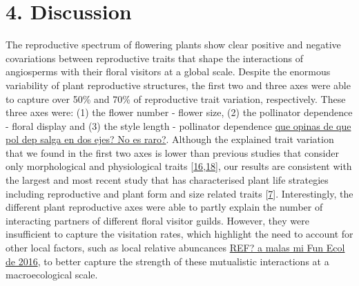 \documentclass[
  12pt,
  a4paper,
]{article}
\begin{document}
\hypertarget{discussion}{%
\section{4. Discussion}\label{discussion}}

The reproductive spectrum of flowering plants show clear positive and negative covariations between reproductive traits that shape the interactions of angiosperms with their floral visitors at a global scale. Despite the enormous variability of plant reproductive structures, the first two and three axes were able to capture over 50\% and 70\% of reproductive trait variation, respectively. These three axes were: (1) the flower number - flower size, (2) the pollinator dependence - floral display and (3) the style length - pollinator dependence \href{}{que opinas de que pol dep salga en dos ejes? No es raro?}. Although the explained trait variation that we found in the first two axes is lower than previous studies that consider only morphological and physiological traits {[}\protect\hyperlink{ref-diaz2016}{16},\protect\hyperlink{ref-carmona2021}{18}{]}, our results are consistent with the largest and most recent study that has characterised plant life strategies including reproductive and plant form and size related traits {[}\protect\hyperlink{ref-salguero2016}{7}{]}. Interestingly, the different plant reproductive axes were able to partly explain the number of interacting partners of different floral visitor guilds. However, they were insufficient to capture the visitation rates, which highlight the need to account for other local factors, such as local relative abuncances \href{}{REF? a malas mi Fun Ecol de 2016}, to better capture the strength of these mutualistic interactions at a macroecological scale.
\end{document}
